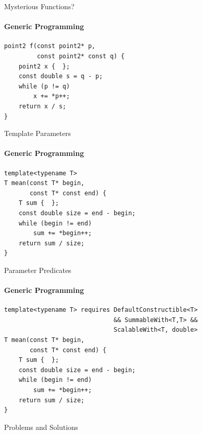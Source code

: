 \documentclass{beamer}
\begin{document}
    \begin{frame}[fragile]{Mysterious Functions?}
        \framesubtitle{Generic Programming}
        \begin{center}
        \begin{lstlisting}[caption={another mysterious, yet strangely familiar function (déjà vu?).}]
point2 f(const point2* p,
         const point2* const q) {
    point2 x {  };
    const double s = q - p;
    while (p != q)
        x += *p++;
    return x / s;
} \end{lstlisting}
        \end{center}
    \end{frame}

    \begin{frame}[fragile]{Template Parameters}
        \framesubtitle{Generic Programming}
        \begin{center}
            \begin{lstlisting}[caption={natural generalization of the function from the previous slides.}]
template<typename T>
T mean(const T* begin,
       const T* const end) {
    T sum {  };
    const double size = end - begin;
    while (begin != end)
        sum += *begin++;
    return sum / size;
} \end{lstlisting}
        \end{center}
    \end{frame}

    \begin{frame}[fragile]{Parameter Predicates}
        \framesubtitle{Generic Programming}
        \begin{center}
        \begin{lstlisting}[caption={constraining the function template using a \texttt{requires} clause.}]
template<typename T> requires DefaultConstructible<T>
                              && SummableWith<T,T> &&
                              ScalableWith<T, double>
T mean(const T* begin,
       const T* const end) {
    T sum {  };
    const double size = end - begin;
    while (begin != end)
        sum += *begin++;
    return sum / size;
} \end{lstlisting}
        \end{center}
    \end{frame}

    \begin{frame}[fragile]{Problems and Solutions}
    \end{frame}
\end{document}
